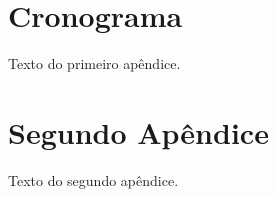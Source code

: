 \begin{apendicesenv}

\partapendices

\chapter{Cronograma}
\label{schedule_appendix}

Texto do primeiro apêndice.

\chapter{Segundo Apêndice}

Texto do segundo apêndice.

\end{apendicesenv}
